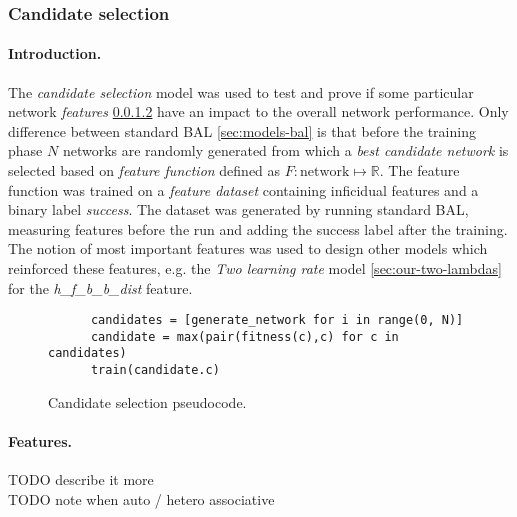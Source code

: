 \subsubsection{Candidate selection} 
\label{sec:our-candidates} 

\paragraph{Introduction.} 
The \emph{candidate selection} model was used to test and prove if some particular network \emph{features} \ref{sec:our-candidates-features} have an impact to the overall network performance. Only difference between standard BAL \ref{sec:models-bal} is that before the training phase $N$ networks are randomly generated from which a \emph{best candidate network} is selected based on \emph{feature function} defined as $F: \mbox{network} \mapsto \mathbb{R}$. The feature function was trained on a \emph{feature dataset} containing inficidual features and a binary label \emph{success}. The dataset was generated by running standard BAL, measuring features before the run and adding the success label after the training. The notion of most important features was used to design other models which reinforced these features, e.g. the \emph{Two learning rate} model \ref{sec:our-two-lambdas} for the \emph{h\_f\_b\_b\_dist} feature. 

\begin{figure}[H]
    \begin{lstlisting} 
      candidates = [generate_network for i in range(0, N)] 
      candidate = max(pair(fitness(c),c) for c in candidates) 
      train(candidate.c) 
    \end{lstlisting} 
  \caption{Candidate selection pseudocode.}
  \label{fig:our-candidates-pseudocode} 
\end{figure} 

\paragraph{Features.}
\label{sec:our-candidates-features}

TODO describe it more \\
TODO note when auto / hetero associative \\

